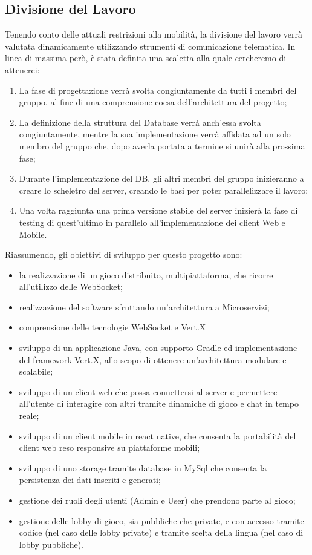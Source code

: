 \subsection{Divisione del Lavoro}
Tenendo conto delle attuali restrizioni alla mobilità, la divisione del lavoro verrà valutata dinamicamente utilizzando strumenti di comunicazione telematica.\newline
In linea di massima però, è stata definita una scaletta alla quale cercheremo di attenerci:
\begin{enumerate}
    \item La fase di progettazione verrà svolta congiuntamente da tutti i membri del gruppo, al fine di una comprensione coesa dell'architettura del progetto;
    \item La definizione della struttura del Database verrà anch'essa svolta congiuntamente, mentre la sua implementazione verrà affidata ad un solo membro del gruppo che, dopo averla portata a termine si unirà alla prossima fase;
    \item Durante l'implementazione del DB, gli altri membri del gruppo inizieranno a creare lo scheletro del server, creando le basi per poter parallelizzare il lavoro;
    \item Una volta raggiunta una prima versione stabile del server inizierà la fase di testing di quest'ultimo in parallelo all'implementazione dei client Web e Mobile.
\end{enumerate}

\noindent Riassumendo, gli obiettivi di sviluppo per questo progetto sono:

\begin{itemize}
    \item la realizzazione di un gioco distribuito, multipiattaforma, che ricorre all'utilizzo delle WebSocket;
    \item realizzazione del software sfruttando un'architettura a Microservizi;
    \item comprensione delle tecnologie WebSocket e Vert.X
    \item sviluppo di un applicazione Java, con supporto Gradle ed implementazione del framework Vert.X, allo scopo di ottenere un'architettura modulare e scalabile;
    \item sviluppo di un client web che possa connettersi al server e permettere all'utente di interagire con altri tramite dinamiche di gioco e chat in tempo reale;
    \item sviluppo di un client mobile in react native, che consenta la portabilità del client web reso responsive su piattaforme mobili;
    \item sviluppo di uno storage tramite database in MySql che consenta la persistenza dei dati inseriti e generati;
    \item gestione dei ruoli degli utenti (Admin e User) che prendono parte al gioco;
    \item gestione delle lobby di gioco, sia pubbliche che private, e con accesso tramite codice (nel caso delle lobby private) e tramite scelta della lingua (nel caso di lobby pubbliche).
\end{itemize}
\newpage
